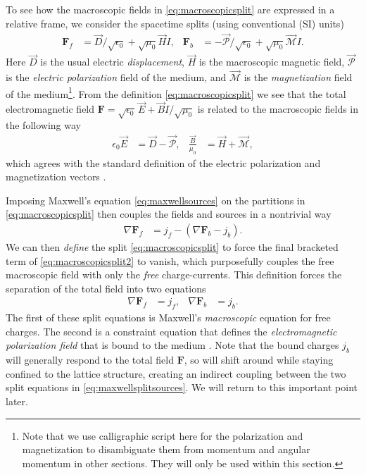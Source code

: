 \documentclass[1p,sort&compress]{elsarticle}
\numberwithin{equation}{section}
\newcommand{\rv}[1]{\vec{#1}}
\newcommand{\bv}[1]{\mathbf{#1}}
\begin{document}
To see how the macroscopic fields in \eqref{eq:macroscopicsplit} are expressed in a relative frame, we consider the spacetime splits (using conventional (SI) units) 
\begin{align}
  \bv{F}_f &= \rv{D}/\sqrt{\epsilon_0} + \sqrt{\mu_0}\rv{H}I, & \bv{F}_b &= -\rv{\mathcal{P}}/\sqrt{\epsilon_0} + \sqrt{\mu_0}\rv{\mathcal{M}}I.
\end{align}
Here $\rv{D}$ is the usual electric \emph{displacement}, $\rv{H}$ is the macroscopic magnetic field, $\rv{\mathcal{P}}$ is the \emph{electric polarization} field of the medium, and $\rv{\mathcal{M}}$ is the \emph{magnetization} field of the medium\footnote{Note that we use calligraphic script here for the polarization and magnetization to disambiguate them from momentum and angular momentum in other sections.  They will only be used within this section.}.  From the definition \eqref{eq:macroscopicsplit} we see that the total electromagnetic field $\bv{F} = \sqrt{\epsilon_0}\,\rv{E} + \rv{B}I/\sqrt{\mu_0}$ is related to the macroscopic fields in the following way
\begin{align}\label{eq:macrofields}
  \epsilon_0 \rv{E} &= \rv{D} - \rv{\mathcal{P}},  & \frac{\rv{B}}{\mu_0} &= \rv{H} + \rv{\mathcal{M}},
\end{align}
which agrees with the standard definition of the electric polarization and magnetization vectors \cite{Jackson1999,Landau1984}.

Imposing Maxwell's equation \eqref{eq:maxwellsources} on the partitions in \eqref{eq:macroscopicsplit} then couples the fields and sources in a nontrivial way
\begin{align}\label{eq:macroscopicsplit2}
  \nabla \bv{F}_f &= j_f - (\nabla \bv{F}_b - j_b).
\end{align}
We can then \emph{define} the split \eqref{eq:macroscopicsplit} to force the final bracketed term of \eqref{eq:macroscopicsplit2} to vanish, which purposefully couples the free macroscopic field with only the \emph{free} charge-currents.  This definition forces the separation of the total field into two equations
\begin{align}\label{eq:maxwellsplitsources}
  \nabla \bv{F}_f &= j_f, &  \nabla \bv{F}_b &= j_b.
\end{align}
The first of these split equations is Maxwell's \emph{macroscopic} equation for free charges.  The second is a constraint equation that defines the \emph{electromagnetic polarization field} that is bound to the medium \cite{Jackson1999,Landau1984}.  Note that the bound charges $j_b$ will generally respond to the total field $\bv{F}$, so will shift around while staying confined to the lattice structure, creating an indirect coupling between the two split equations in \eqref{eq:maxwellsplitsources}.  We will return to this important point later.
\end{document}
